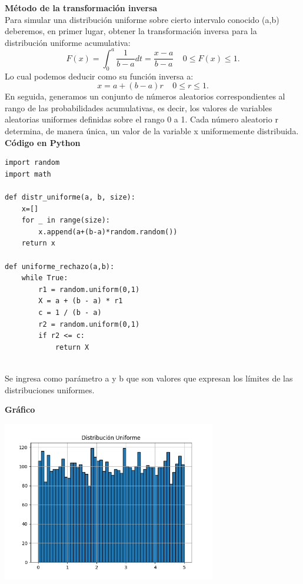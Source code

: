 \documentclass[11pt]{article}
\begin{document}
\noindent\textbf{Método de la transformación inversa}\\
  Para simular una distribución uniforme sobre cierto intervalo conocido (a,b) deberemos, en primer lugar, obtener la transformación inversa para la distribución uniforme acumulativa:
\begin{equation}
    F(x) = \int_{0}^{a}\frac{1}{b-a}dt = \frac{x-a}{b-a} \ \text{  } \ 0 \leq F(x) \leq 1.
  \end{equation}
Lo cual podemos deducir como su función inversa a:
  \begin{equation}
  x = a +(b-a)r \ \text{  }\ 0 \leq r \leq 1.
  \end{equation}
En seguida, generamos un conjunto de números aleatorios correspondientes al rango de las probabilidades acumulativas, es decir, los valores de variables aleatorias uniformes definidas sobre el rango 0 a 1. Cada número aleatorio r determina, de manera única, un valor de la variable x uniformemente distribuida.
\newpage
\noindent\textbf{Código en Python}

\begin{lstlisting}
import random
import math

def distr_uniforme(a, b, size):
    x=[]
    for _ in range(size):
        x.append(a+(b-a)*random.random())
    return x

def uniforme_rechazo(a,b):
    while True:
        r1 = random.uniform(0,1)
        X = a + (b - a) * r1
        c = 1 / (b - a)
        r2 = random.uniform(0,1) 
        if r2 <= c:
            return X
    
\end{lstlisting}
Se ingresa como parámetro a y b que son valores que expresan los límites de las distribuciones uniformes.

\noindent\textbf{Gráfico}

\begin{center}
\includegraphics[width=0.7\textwidth]{Images/histograma_uniforme.png}
\end{center}
\end{document}
